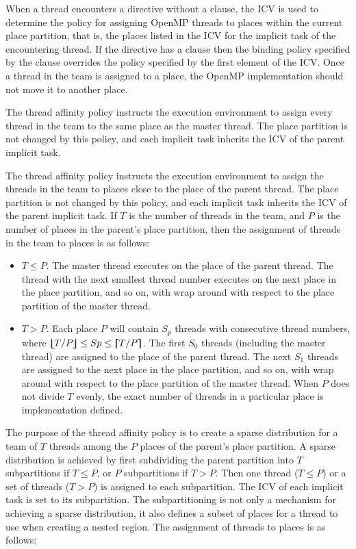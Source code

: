 When a thread encounters a  directive without a  clause, the  ICV is used to determine the policy for assigning OpenMP threads to places within the current place partition, that is, the places listed in the  ICV for the implicit task of the encountering thread. If the  directive has a  clause then the binding policy specified by the  clause overrides the policy specified by the first element of the  ICV. Once a thread in the team is assigned to a place, the OpenMP implementation should not move it to another place.

The  thread affinity policy instructs the execution environment to assign every thread in the team to the same place as the master thread. The place partition is not changed by this policy, and each implicit task inherits the  ICV of the parent implicit task.

The  thread affinity policy instructs the execution environment to assign the threads in the team to places close to the place of the parent thread. The place partition is not changed by this policy, and each implicit task inherits the  ICV of the parent implicit task. If $T$ is the number of threads in the team, and $P$ is the number of places in the parent's place partition, then the assignment of threads in the team to places is as follows:

\begin{itemize}
\item $T\leq P$.
The master thread executes on the place of the parent thread. The thread with the next smallest thread number executes on the next place in the place partition, and so on, with wrap around with respect to the place partition of the master thread.
\item $T>P$.
Each place $P$ will contain $S_{p}$ threads with consecutive thread numbers,
where $\blfloor T/P \brfloor \leq Sp \leq \blceil T/P \brceil$. The first $S_{0}$ threads (including the master thread) are assigned to the place of the parent thread. The next $S_{1}$ threads are assigned to the next place in the place partition, and so on, with wrap around with respect to the place partition of the master thread. When $P$ does not divide $T$ evenly, the exact number of threads in a particular place is implementation defined.
\end{itemize}


The purpose of the  thread affinity policy is to create a sparse distribution for a
team of $T$ threads among the $P$ places of the parent's place partition. A sparse distribution is achieved
by first subdividing the parent partition into $T$ subpartitions if
$T\leq P$, or $P$ subpartitions if $T>P$. Then one thread ($T\leq P$) or a
set of threads ($T>P$) is assigned to each subpartition. The
 ICV of each implicit task is set to its subpartition.
The subpartitioning is not only a mechanism for achieving a sparse
distribution, it also defines a subset of places for a thread to use when
creating a nested  region. The assignment of threads to places is as
follows:

